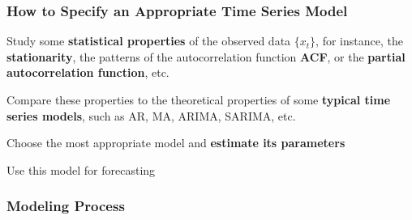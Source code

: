 \documentclass{beamer}
\newenvironment{wideenumerate}{\enumerate\addtolength{\itemsep}{10pt}}{\endenumerate}
\begin{document}
\begin{frame}
  \frametitle{How to Specify an Appropriate Time Series Model}
  \begin{wideenumerate}
    \item Study some \textbf{statistical properties} of the observed data $\{x_t\}$, for instance, the \textbf{stationarity}, the patterns of the autocorrelation function \textbf{ACF}, or the \textbf{partial autocorrelation function}, etc.
    \item Compare these properties to the theoretical properties of some \textbf{typical time series models}, such as AR, MA, ARIMA, SARIMA, etc.
    \item Choose the most appropriate model and \textbf{estimate its parameters}
    \item Use this model for forecasting
  \end{wideenumerate}
\end{frame}

\begin{frame} %
  \frametitle{Modeling Process}
\end{frame}
\end{document}
